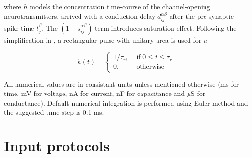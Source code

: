 \documentclass{article}
\begin{document}
\noindent
where $h$ models the concentration time-course of the channel-opening neurotransmitters, arrived with a conduction delay $d^{\alpha\beta}_{ij}$ after the pre-synaptic spike time $t^{\beta}_{j}$. 
The $(1-s_{ij}^{\alpha\beta})$ term introduces saturation effect. 
Following the simplification in \cite{destexhe1994efficient}, a rectangular pulse with unitary area is used for $h$

\begin{equation}
h(t) = 
\begin{cases}
1/\tau_{r},& \text{ if } 0\leq t \leq \tau_{r}\\
0,& \text{ otherwise}
\end{cases}
\end{equation}


All numerical values are in consistant units unless mentioned otherwise (ms for time, mV for voltage, nA for current, nF for capacitance and ${\mu}$S for conductance). 
Default numerical integration is performed using Euler method and the suggested time-step is 0.1 ms\cite{litwin2012slow}.



%	




\section{Input protocols}
\label{sec:Input protocols}
\end{document}
